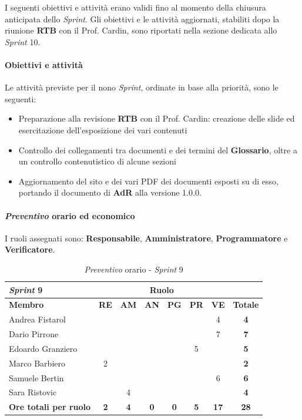 \documentclass[12pt, a4paper]{article}
\begin{document}
{I seguenti obiettivi e attività erano validi fino al momento della chiusura anticipata dello \textit{Sprint}. Gli obiettivi e le attività aggiornati, stabiliti dopo la riunione \textbf{RTB} con il Prof. Cardin, sono riportati nella sezione dedicata allo \textit{Sprint} 10.

\paragraph{Obiettivi e attività}

Le attività previste per il nono \textit{Sprint}, ordinate in base alla priorità, sono le seguenti:

\begin{itemize}
    \item Preparazione alla revisione \textbf{RTB} con il Prof. Cardin: creazione delle slide ed esercitazione dell'esposizione dei vari contenuti
    \item Controllo dei collegamenti tra documenti e dei termini del \textbf{Glossario}, oltre a un controllo contenutistico di alcune sezioni
    \item Aggiornamento del sito e dei vari PDF dei documenti esposti su di esso, portando il documento di \textbf{AdR} alla versione 1.0.0.
\end{itemize}

\paragraph{\textit{Preventivo} orario ed economico}

I ruoli assegnati sono: \textbf{Responsabile}, \textbf{Amministratore}, \textbf{Programmatore} e \textbf{Verificatore}.
\begin{table}[H]
    \centering
    \renewcommand{\arraystretch}{1.3}
    \begin{tabularx}{0.9\textwidth}{|X|c|c|c|c|c|c|c|}
        \hline
        \textbf{\textit{Sprint} 9} & \multicolumn{6}{|c|}{\textbf{Ruolo}} & \\ \hline
        \textbf{Membro} & \textbf{RE} & \textbf{AM} & \textbf{AN} & \textbf{PG} & \textbf{PR} & \textbf{VE} & \textbf{Totale} \\ \hline
        Andrea Fistarol  & & & & & & 4 & \textbf{4} \\ \hline
        Dario Pirrone    & & & & & & 7 & \textbf{7} \\ \hline
        Edoardo Granziero & & & & & 5 & & \textbf{5} \\ \hline
        Marco Barbiero   & 2 & & & & & & \textbf{2} \\ \hline
        Samuele Bertin   & & & & & & 6 & \textbf{6} \\ \hline
        Sara Ristovic    & & 4 & & & & & \textbf{4} \\ \hline
        \textbf{Ore totali per ruolo} & \textbf{2} & \textbf{4} & \textbf{0} & \textbf{0} & \textbf{5} & \textbf{17} & \textbf{28} \\ \hline
    \end{tabularx}
    \caption{\textit{Preventivo} orario - \textit{Sprint} 9}
\end{table}

}
\end{document}
